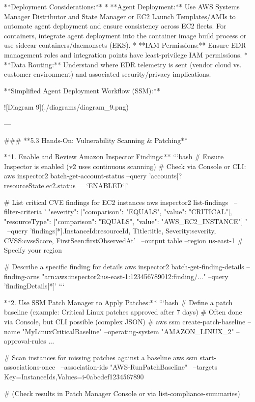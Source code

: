 \documentclass{article}
\begin{document}
**Deployment Considerations:**
* **Agent Deployment:** Use AWS Systems Manager Distributor and State Manager or EC2 Launch Templates/AMIs to automate agent deployment and ensure consistency across EC2 fleets. For containers, integrate agent deployment into the container image build process or use sidecar containers/daemonsets (EKS).
* **IAM Permissions:** Ensure EDR management roles and integration points have least-privilege IAM permissions.
* **Data Routing:** Understand where EDR telemetry is sent (vendor cloud vs. customer environment) and associated security/privacy implications.

**Simplified Agent Deployment Workflow (SSM):**


![Diagram 9](./diagrams/diagram_9.png)



---

### **5.3 Hands-On: Vulnerability Scanning & Patching**

**1. Enable and Review Amazon Inspector Findings:**
```bash
# Ensure Inspector is enabled (v2 uses continuous scanning)
# Check via Console or CLI:
aws inspector2 batch-get-account-status --query 'accounts[?resourceState.ec2.status==`ENABLED`]'

# List critical CVE findings for EC2 instances
aws inspector2 list-findings \
    --filter-criteria '{ "severity": [{"comparison": "EQUALS", "value": "CRITICAL"}], "resourceType": [{"comparison": "EQUALS", "value": "AWS_EC2_INSTANCE"}] }' \
    --query 'findings[*].{InstanceId:resourceId, Title:title, Severity:severity, CVSS:cvssScore, FirstSeen:firstObservedAt}' \
    --output table --region us-east-1 # Specify your region

# Describe a specific finding for details
aws inspector2 batch-get-finding-details --finding-arns "arn:aws:inspector2:us-east-1:123456789012:finding/..." --query 'findingDetails[*]'
```

**2. Use SSM Patch Manager to Apply Patches:**
```bash
# Define a patch baseline (example: Critical Linux patches approved after 7 days)
# Often done via Console, but CLI possible (complex JSON)
# aws ssm create-patch-baseline --name "MyLinuxCriticalBaseline" --operating-system "AMAZON_LINUX_2" --approval-rules ...

# Scan instances for missing patches against a baseline
aws ssm start-associations-once \
    --association-ids "AWS-RunPatchBaseline" \
    --targets Key=InstanceIds,Values=i-0abcdef1234567890

# (Check results in Patch Manager Console or via list-compliance-summaries)
\end{document}
